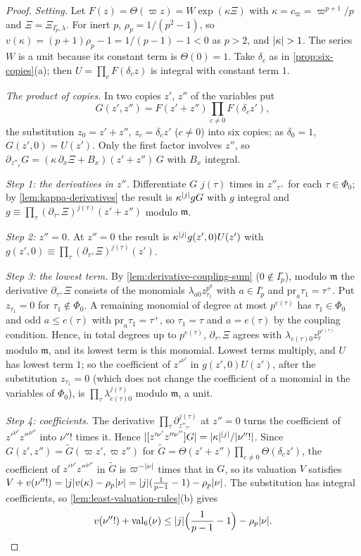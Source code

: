 \begin{proof}
\emph{Setting.} Let $F(z)=\Theta(\varpi z)=W\exp(\kappa\Xi)$ with $\kappa=c_\varpi=\varpi^{p+1}/p$ and $\Xi=\Xi_{I_p^\circ,\lambda}$. For inert $p$, $\rho_p=1/(p^2-1)$, so $v(\kappa)=(p+1)\rho_p-1=1/(p-1)-1<0$ as $p>2$, and $\lvert \kappa\rvert>1$. The series $W$ is a unit because its constant term is $\Theta(0)=1$. Take $\delta_c$ as in \cref{prop:six-copies}(a); then $U=\prod_cF(\delta_cz)$ is integral with constant term $1$.

\emph{The product of copies.} In two copies $z'$, $z''$ of the variables put
\[
  G(z',z'')=F(z'+z'')\prod_{c\ne0}F(\delta_cz'),
\]
the substitution $z_0=z'+z''$, $z_c=\delta_cz'$ ($c\ne0$) into six copies; as $\delta_0=1$, $G(z',0)=U(z')$. Only the first factor involves $z''$, so $\partial_{z''_x}G=(\kappa\,\partial_x\Xi+B_x)(z'+z'')\,G$ with $B_x$ integral.

\emph{Step 1: the derivatives in $z''$.} Differentiate $G$ $j(\tau)$ times in $z''_{\tau^+}$ for each $\tau\in\Phi_0$; by \cref{lem:kappa-derivatives} the result is $\kappa^{\lvert j\rvert}gG$ with $g$ integral and $g\equiv\prod_\tau(\partial_{\tau^+}\Xi)^{j(\tau)}(z'+z'')$ modulo $\mathfrak m$.

\emph{Step 2: $z''=0$.} At $z''=0$ the result is $\kappa^{\lvert j\rvert}g(z',0)U(z')$ with $g(z',0)\equiv\prod_\tau(\partial_{\tau^+}\Xi)^{j(\tau)}(z')$.

\emph{Step 3: the lowest term.} By \cref{lem:derivative-coupling-sum} ($0\notin I_p^\circ$), modulo $\mathfrak m$ the derivative $\partial_{\tau^+}\Xi$ consists of the monomials $\lambda_{a0}z_{\tau_1}^{p^a}$ with $a\in I_p^\circ$ and $\mathrm{pr}_a\tau_1=\tau^+$. Put $z_{\tau_1}=0$ for $\tau_1\notin\Phi_0$. A remaining monomial of degree at most $p^{e(\tau)}$ has $\tau_1\in\Phi_0$ and odd $a\le e(\tau)$ with $\mathrm{pr}_a\tau_1=\tau^+$, so $\tau_1=\tau$ and $a=e(\tau)$ by the coupling condition. Hence, in total degrees up to $p^{e(\tau)}$, $\partial_{\tau^+}\Xi$ agrees with $\lambda_{e(\tau)0}z_\tau^{p^{e(\tau)}}$ modulo $\mathfrak m$, and its lowest term is this monomial. Lowest terms multiply, and $U$ has lowest term $1$; so the coefficient of $z'^{\nu'}$ in $g(z',0)U(z')$, after the substitution $z_{\tau_1}=0$ (which does not change the coefficient of a monomial in the variables of $\Phi_0$), is $\prod_\tau\lambda_{e(\tau)0}^{j(\tau)}$ modulo $\mathfrak m$, a unit.

\emph{Step 4: coefficients.} The derivative $\prod_\tau\partial_{z''_{\tau^+}}^{j(\tau)}$ at $z''=0$ turns the coefficient of $z'^{\nu'}z''^{\nu''}$ into $\nu''!$ times it. Hence $\lvert [z'^{\nu'}z''^{\nu''}]G\rvert=\lvert \kappa\rvert^{\lvert j\rvert}/\lvert \nu''!\rvert$. Since $G(z',z'')=\tilde G(\varpi z',\varpi z'')$ for $\tilde G=\Theta(z'+z'')\prod_{c\ne0}\Theta(\delta_cz')$, the coefficient of $z'^{\nu'}z''^{\nu''}$ in $\tilde G$ is $\varpi^{-\lvert \nu\rvert}$ times that in $G$, so its valuation $V$ satisfies $V+v(\nu''!)=\lvert j\rvert v(\kappa)-\rho_p\lvert \nu\rvert=\lvert j\rvert(\frac1{p-1}-1)-\rho_p\lvert \nu\rvert$. The substitution has integral coefficients, so \cref{lem:least-valuation-rules}(b) gives
\[
  v(\nu''!)+\mathrm{val}_6(\nu)\le\lvert j\rvert\Bigl(\frac1{p-1}-1\Bigr)-\rho_p\lvert \nu\rvert .
\]


\end{proof}
